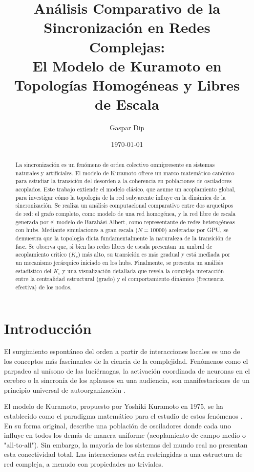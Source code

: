 \documentclass[12pt, a4paper]{article}
\title{Análisis Comparativo de la Sincronización en Redes Complejas: \\ El Modelo de Kuramoto en Topologías Homogéneas y Libres de Escala}
\author{Gaspar Dip}
\date{\today}
\begin{document}
\maketitle

\begin{abstract}
\noindent La sincronización es un fenómeno de orden colectivo omnipresente en sistemas naturales y artificiales. El modelo de Kuramoto ofrece un marco matemático canónico para estudiar la transición del desorden a la coherencia en poblaciones de osciladores acoplados. Este trabajo extiende el modelo clásico, que asume un acoplamiento global, para investigar cómo la topología de la red subyacente influye en la dinámica de la sincronización. Se realiza un análisis computacional comparativo entre dos arquetipos de red: el grafo completo, como modelo de una red homogénea, y la red libre de escala generada por el modelo de Barabási-Albert, como representante de redes heterogéneas con hubs. Mediante simulaciones a gran escala (\(N=10000\)) aceleradas por GPU, se demuestra que la topología dicta fundamentalmente la naturaleza de la transición de fase. Se observa que, si bien las redes libres de escala presentan un umbral de acoplamiento crítico (\(K_c\)) más alto, su transición es más gradual y está mediada por un mecanismo jerárquico iniciado en los hubs. Finalmente, se presenta un análisis estadístico del \(K_c\) y una visualización detallada que revela la compleja interacción entre la centralidad estructural (grado) y el comportamiento dinámico (frecuencia efectiva) de los nodos.
\end{abstract}

\newpage

\section{Introducción}

El surgimiento espontáneo del orden a partir de interacciones locales es uno de los conceptos más fascinantes de la ciencia de la complejidad. Fenómenos como el parpadeo al unísono de las luciérnagas, la activación coordinada de neuronas en el cerebro o la sincronía de los aplausos en una audiencia, son manifestaciones de un principio universal de autoorganización \cite{Strogatz2003}.

El modelo de Kuramoto, propuesto por Yoshiki Kuramoto en 1975, se ha establecido como el paradigma matemático para el estudio de estos fenómenos \cite{Kuramoto1975}. En su forma original, describe una población de osciladores donde cada uno influye en todos los demás de manera uniforme (acoplamiento de campo medio o "all-to-all"). Sin embargo, la mayoría de los sistemas del mundo real no presentan esta conectividad total. Las interacciones están restringidas a una estructura de red compleja, a menudo con propiedades no triviales.
\end{document}
